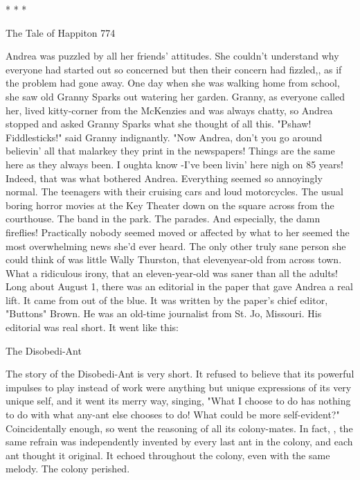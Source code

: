                                         *   *   *




The Tale of Happiton                                                                  774

        Andrea was puzzled by all her friends' attitudes. She couldn't understand why
everyone had started out so concerned but then their concern had fizzled,, as if the
problem had gone away. One day when she was walking home from school, she saw
old Granny Sparks out watering her garden. Granny, as everyone called her, lived
kitty-corner from the McKenzies and was always chatty, so Andrea stopped and asked
Granny Sparks what she thought of all this. "Pshaw! Fiddlesticks!" said Granny
indignantly. "Now Andrea, don't you go around believin' all that malarkey they print
in the newspapers! Things are the same here as they always been. I oughta know -I've
been livin' here nigh on 85 years!
        Indeed, that was what bothered Andrea. Everything seemed so annoyingly
normal. The teenagers with their cruising cars and loud motorcycles. The usual boring
horror movies at the Key Theater down on the square across from the courthouse. The
band in the park. The parades. And especially, the damn fireflies! Practically nobody
seemed moved or affected by what to her seemed the most overwhelming news she'd
ever heard. The only other truly sane person she could think of was little Wally
Thurston, that elevenyear-old from across town. What a ridiculous irony, that an
eleven-year-old was saner than all the adults!
        Long about August 1, there was an editorial in the paper that gave Andrea a
real lift. It came from out of the blue. It was written by the paper's chief editor,
"Buttons" Brown. He was an old-time journalist from St. Jo, Missouri. His editorial
was real short. It went like this:

The Disobedi-Ant

          The story of the Disobedi-Ant is very short. It refused to believe that its
  powerful impulses to play instead of work were anything but unique
  expressions of its very unique self, and it went its merry way, singing, "What I
  choose to do has nothing to do with what any-ant else chooses to do! What
  could be more self-evident?"
          Coincidentally enough, so went the reasoning of all its colony-mates. In
  fact, , the same refrain was independently invented by every last ant in the
  colony, and each ant thought it original. It echoed throughout the colony, even
  with the same melody.
          The colony perished.


